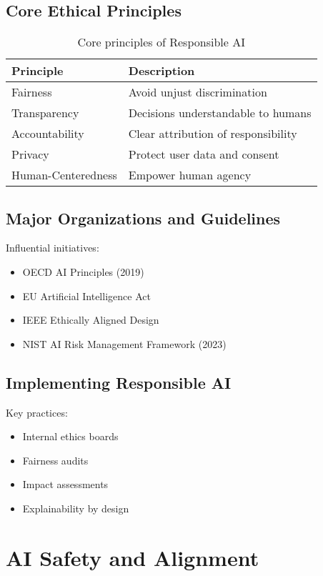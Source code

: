 \documentclass[openany]{book}
\begin{document}
\subsection{Core Ethical Principles}
\begin{table}[h]
\centering
\begin{tabular}{|l|l|}
\hline
\textbf{Principle} & \textbf{Description} \\ \hline
Fairness & Avoid unjust discrimination \\ \hline
Transparency & Decisions understandable to humans \\ \hline
Accountability & Clear attribution of responsibility \\ \hline
Privacy & Protect user data and consent \\ \hline
Human-Centeredness & Empower human agency \\ \hline
\end{tabular}
\caption{Core principles of Responsible AI}
\end{table}

\subsection{Major Organizations and Guidelines}
Influential initiatives:

\begin{itemize}
    \item OECD AI Principles (2019)
    \item EU Artificial Intelligence Act
    \item IEEE Ethically Aligned Design
    \item NIST AI Risk Management Framework (2023)
\end{itemize}

\subsection{Implementing Responsible AI}
Key practices:

\begin{itemize}
    \item Internal ethics boards
    \item Fairness audits
    \item Impact assessments
    \item Explainability by design
\end{itemize}

\section{AI Safety and Alignment}
\end{document}
